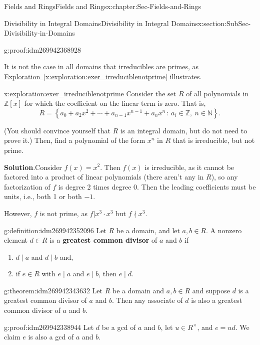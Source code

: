 \documentclass[oneside,10pt,]{book}
\newcommand{\terminology}[1]{\textbf{#1}}
\numberwithin{equation}{section}
\newcommand{\setof}[2]{{\left\{#1\,\colon\,#2\right\}}}
\def\Z{{\mathbb Z}}
\def\N{{\mathbb N}}
\begin{document}
\begin{chapterptx}{Fields and Rings}{}{Fields and Rings}{}{}{x:chapter:Sec-Fields-and-Rings}
\begin{sectionptx}{Divisibility in Integral Domains}{}{Divisibility in Integral Domains}{}{}{x:section:SubSec-Divisibility-in-Domains}
\begin{proofptx}{}{g:proof:idm269942368928}
\end{proofptx}
It is not the case in all domains that irreducibles are primes, as \hyperref[x:exploration:exer_irreduciblenotprime]{Exploration~\ref{x:exploration:exer_irreduciblenotprime}} illustrates.%
\begin{exploration}{}{x:exploration:exer_irreduciblenotprime}%
Consider the set \(R\) of all polynomials in \(\Z[x]\) for which the coefficient on the linear term is zero. That is,%
\begin{equation*}
R = \setof{a_0 + a_2 x^2 + \cdots + a_{n-1} x^{n-1} + a_n x^n}{a_i\in \Z,\ n\in\N}\text{.}
\end{equation*}
%
\par
(You should convince yourself that \(R\) is an integral domain, but do not need to prove it.) Then, find a polynomial of the form \(x^n\) in \(R\) that is irreducible, but not prime.%
\par\smallskip%
\noindent\textbf{Solution}.\hypertarget{g:solution:idm269942357152}{}\quad{}Consider \(f(x) = x^2\). Then \(f(x)\) is irreducible, as it cannot be factored into a product of linear polynomials (there aren't any in \(R\)), so any factorization of \(f\) is degree 2 times degree 0. Then the leading coefficients must be units, i.e., both 1 or both \(-1\).%
\par
However, \(f\) is not prime, as \(f| x^3 \cdot x^3\) but \(f\nmid x^3\).%
\end{exploration}
\begin{definition}{}{g:definition:idm269942352096}%
Let \(R\) be a domain, and let \(a,b\in R\). A nonzero element \(d\in R\) is a \terminology{greatest common divisor} of \(a\) and \(b\) if%
\begin{enumerate}
\item{}\(d\mid a\) and \(d\mid b\) and,%
\item{}if \(e\in R\) with \(e\mid a\) and \(e\mid b\), then \(e\mid d\).%
\end{enumerate}
%
\end{definition}
\begin{theorem}{}{}{g:theorem:idm269942343632}%
Let \(R\) be a domain and \(a,b\in R\) and suppose \(d\) is a greatest common divisor of \(a\) and \(b\). Then any associate of \(d\) is also a greatest common divisor of \(a\) and \(b\).%
\end{theorem}
\begin{proofptx}{}{g:proof:idm269942338944}
Let \(d\) be a gcd of \(a\) and \(b\), let \(u\in R^\times\), and \(e =ud\). We claim \(e\) is also a gcd of \(a\) and \(b\).%

\end{proofptx}
\end{sectionptx}
\end{chapterptx}
\end{document}
